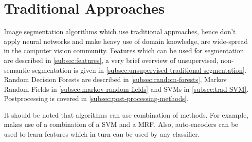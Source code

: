 
\section{Traditional Approaches}\label{sec:traditional-approaches}%
Image segmentation algorithms which use traditional approaches, hence don't
apply neural networks and make heavy use of domain knowledge, are wide-spread
in the computer vision community. Features which can be used for segmentation
are described in \cref{subsec:features}, a very brief overview of unsupervised,
non-semantic segmentation is given in
\cref{subsec:unsupervised-traditional-segmentation}, Random Decision
Forests are described in \cref{subsec:random-forests}, Markov Random Fields in \cref{subsec:markov-random-fields}
 and \glspl{SVM} in
\cref{subsec:trad-SVM}.
Postprocessing is covered in \cref{subsec:post-processing-methods}.

It should be noted that algorithms can use combination of methods. For example,
\cite{tighe2014scene} makes use of a combination of a \gls{SVM} and a
\gls{MRF}. Also, auto-encoders can be used to learn features which in turn
can be used by any classifier.










